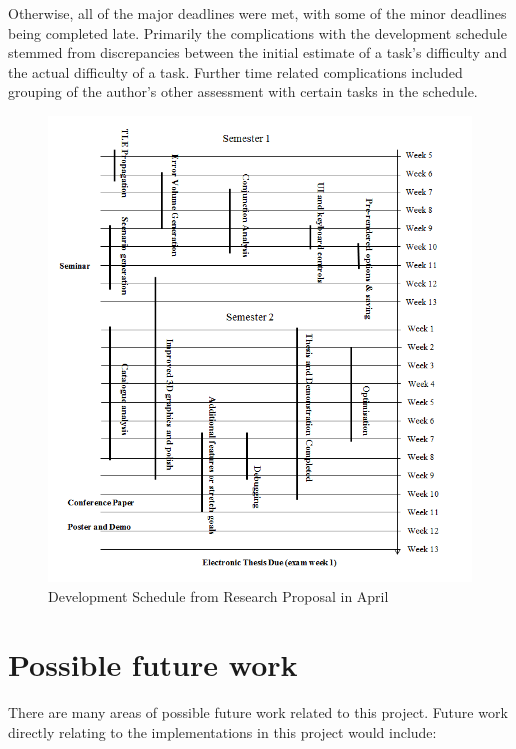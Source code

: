 \documentclass[12pt,openany,a4paper]{book}
\begin{document}
	Otherwise, all of the major deadlines were met, with some of the minor deadlines being completed late. Primarily the complications with the development schedule stemmed from discrepancies between the initial estimate of a task's difficulty and the actual difficulty of a task. Further time related complications included grouping of the author's other assessment with certain tasks in the schedule.
			\begin{figure}[H]
				\centering
				\caption{Development Schedule from Research Proposal in April}
				\label{DevSched}
				\includegraphics[scale=0.5]{DevSched.png}
			\end{figure}
	
	\section{Possible future work}
	
	There are many areas of possible future work related to this project. Future work directly relating to the implementations in this project would include:
	
\end{document}
